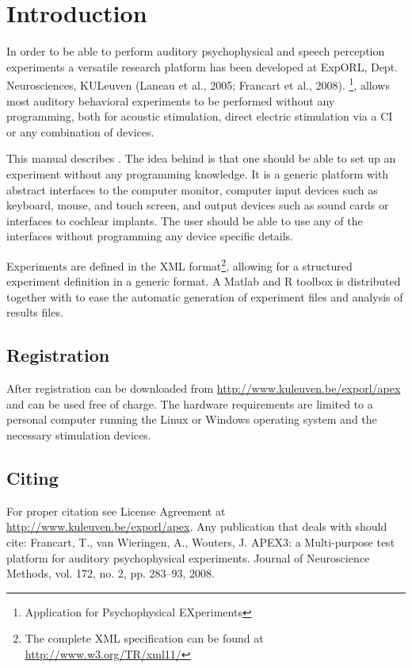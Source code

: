 \chapter{Introduction}

In order to be able to perform auditory psychophysical and speech
perception experiments a versatile research platform has been
developed at ExpORL, Dept. Neurosciences, KULeuven (Laneau et al.,
2005; Francart et al., 2008). \apex
\footnote{Application for Psychophysical EXperiments}, allows
most auditory behavioral experiments to be performed without any
programming, both for acoustic stimulation, direct electric
stimulation via a CI or any combination of devices.

This manual describes \apex. The idea behind \apex is that one
should be able to set up an experiment without any programming
knowledge. It is a generic platform with abstract interfaces to
the computer monitor, computer input devices such as keyboard,
mouse, and touch screen, and output devices such as sound cards or
interfaces to cochlear implants. The user should be able to use
any of the interfaces without programming any device specific
details.

Experiments are defined in the {XML}
format\footnote{The complete XML specification can be found at
\url{http://www.w3.org/TR/xml11/}}, allowing for a structured
experiment definition in a generic format. A Matlab and R toolbox is
distributed together with \apex to ease the automatic generation
of experiment files and analysis of results files.

\section{Registration}

After registration \apex can be downloaded from
\url{http://www.kuleuven.be/exporl/apex} and can be used free of
charge. The hardware requirements are limited to a personal
computer running the Linux or Windows operating system and the
necessary stimulation devices.

\section {Citing}

For proper citation see License Agreement at
\url{http://www.kuleuven.be/exporl/apex}. Any publication that
deals with \apex should cite: Francart, T., van Wieringen, A.,
Wouters, J. APEX3: a Multi-purpose test platform for auditory
psychophysical experiments. Journal of Neuroscience Methods, vol. 172, no. 2, pp. 283–93, 2008.

